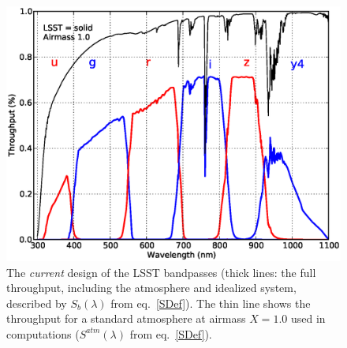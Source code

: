 \begin{figure}[h]\centering
\includegraphics[width=\textwidth]{filters_thruputs.ps}
\caption{The {\it current} design of the LSST bandpasses (thick lines:
the full throughput, including the atmosphere and idealized system,
described by $S_b(\lambda)$ from eq.~\ref{SDef}).
The thin line shows the throughput for a standard atmosphere at
airmass $X=1.0$ used in computations ($S^{atm}(\lambda)$ from eq.~\ref{SDef}).}
\end{figure}


\newpage
{}

\bigskip

